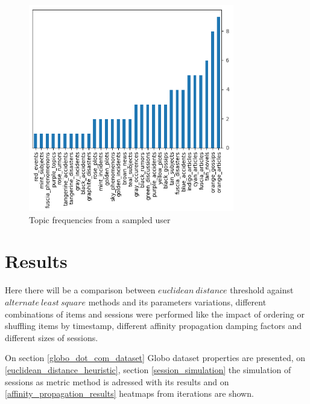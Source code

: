 \documentclass[ecp,tc,english]{iiufrgs}
\begin{document}
        \begin{figure}[H]
            \centering
            \includegraphics[width=0.8\textwidth]{images/belford.png}
            \caption{Topic frequencies from a sampled user}
            \label{fig:belford}
        \end{figure}


\chapter{Results}

    Here there will be a comparison between \(euclidean\ distance\) threshold against \(alternate\ least\ square\) methods and its parameters variations, different combinations of items and sessions were performed like the impact of ordering or shuffling items by timestamp, different affinity propagation damping factors and different sizes of sessions.
    
    On section \ref{globo_dot_com_dataset} Globo dataset properties are presented, on \ref{euclidean_distance_heuristic}, section \ref{session_simulation} the simulation of sessions as metric method is adressed with its results and on \ref{affinity_propagation_results} heatmaps from iterations are shown.

\end{document}
